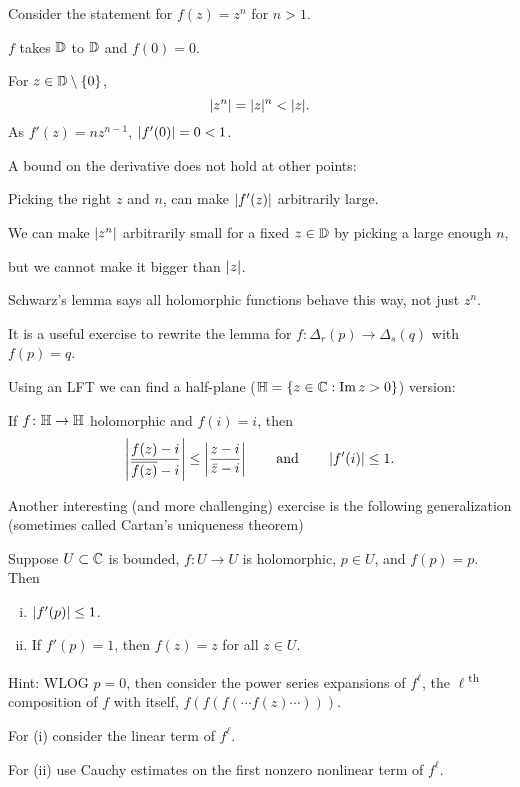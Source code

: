 \documentclass[10pt,aspectratio=169]{beamer}
\begin{document}
\begin{frame}
Consider the statement for $f(z) = z^n$ for $n > 1$.

\pause
\medskip

$f$ takes ${\mathbb{D}}$ to ${\mathbb{D}}$ and $f(0) = 0$.

\pause
\medskip

For $z \in {\mathbb{D}} \setminus \{ 0 \}$,
\[
\lvert {z^n} \rvert =
\lvert {z} \rvert^n < \lvert {z} \rvert .
\]
\pause
As $f'(z) = n z^{n-1}$,
$\lvert {f'(0)} \rvert = 0 < 1$.

\pause
\medskip

A bound on the derivative does not hold at other points:

Picking the right $z$ and $n$,
can make $\lvert {f'(z)} \rvert$ arbitrarily large.

\medskip
\pause

We can make $\lvert {z^n} \rvert$ arbitrarily small for a fixed $z \in {\mathbb{D}}$ by picking
a large enough $n$,

but we cannot make it bigger than $\lvert {z} \rvert$.

\medskip
\pause

Schwarz's lemma says all holomorphic functions
behave this way, not just $z^n$.
\end{frame}

\begin{frame}
It is a useful exercise to rewrite the lemma for
$f \colon \Delta_r(p) \to \Delta_s(q)$ with $f(p)=q$.

\medskip
\pause

Using an LFT we can find a half-plane (${\mathbb{H}} = \{ z \in {\mathbb{C}} : \operatorname{Im} z > 0 \}$)
version:

\medskip
\pause

If $f \colon {\mathbb{H}} \to {\mathbb{H}}$ holomorphic and $f(i) = i$, then
\[
\left\lvert {\frac{f(z)-i}{\overline{f(z)}-i}} \right\rvert \leq
\left\lvert {\frac{z-i}{\bar{z}-i}} \right\rvert 
\qquad
\text{and}
\qquad
\left\lvert {f'(i)} \right\rvert \leq 1 .
\]

\medskip
\pause
Another interesting (and more challenging) exercise is the following
generalization (sometimes called Cartan's uniqueness theorem)

\medskip
\pause

Suppose $U \subset {\mathbb{C}}$ is bounded, $f \colon U \to U$ is holomorphic, $p \in U$,
and $f(p)=p$.  Then
\begin{enumerate}[(i)]
\item
$\left\lvert {f'(p)} \right\rvert \leq 1$.
\item
If $f'(p) = 1$, then $f(z) = z$ for all $z \in U$.
\end{enumerate}
\pause
Hint: WLOG $p=0$,
\pause
then consider the power series
expansions of
$f^{\ell}$, the $\ell$\textsuperscript{th} composition of $f$ with itself,
$f(f(f(\cdots f(z) \cdots)))$.

\pause

For (i) consider the linear term of $f^{\ell}$.

\pause

For (ii) use Cauchy estimates on the first nonzero nonlinear term of
$f^{\ell}$.

\end{frame}
\end{document}
